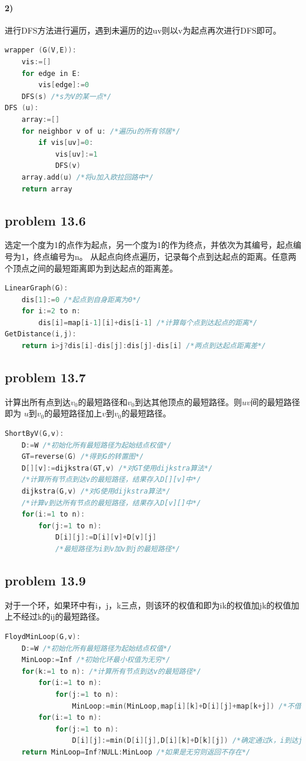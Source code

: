 \documentclass[11pt,a4paper,oneside,oldfontcommands]{ctexart}
\begin{document}
\paragraph*{2)}
进行DFS方法进行遍历，遇到未遍历的边uv则以v为起点再次进行DFS即可。
\begin{lstlisting}[language=C++,title=Euler.func]
wrapper (G(V,E)):
	vis:=[]
	for edge in E:
		vis[edge]:=0
	DFS(s) /*s为V的某一点*/
DFS (u):
	array:=[]
	for neighbor v of u: /*遍历u的所有邻居*/
		if vis[uv]=0:
			vis[uv]:=1
			DFS(v)
	array.add(u) /*将u加入欧拉回路中*/
	return array
\end{lstlisting}
\newpage
{\subsection*{problem 13.6}}
选定一个度为1的点作为起点，另一个度为1的作为终点，并依次为其编号，起点编号为1，终点编号为n。
从起点向终点遍历，记录每个点到达起点的距离。任意两个顶点之间的最短距离即为到达起点的距离差。
\begin{lstlisting}[language=C++,title=LinearGraph.func]
LinearGraph(G):
	dis[1]:=0 /*起点到自身距离为0*/
	for i:=2 to n:
		dis[i]=map[i-1][i]+dis[i-1] /*计算每个点到达起点的距离*/
GetDistance(i,j):
	return i>j?dis[i]-dis[j]:dis[j]-dis[i] /*两点到达起点距离差*/
\end{lstlisting}
{\subsection*{problem 13.7}}
计算出所有点到达$v_0$的最短路径和$v_0$到达其他顶点的最短路径。则$uv$间的最短路径即为
$u$到$v_0$的最短路径加上$v$到$v_0$的最短路径。
\begin{lstlisting}[language=C++,title=ShortByV.func]
ShortByV(G,v):
	D:=W /*初始化所有最短路径为起始结点权值*/
	GT=reverse(G) /*得到G的转置图*/
	D[][v]:=dijkstra(GT,v) /*对GT使用dijkstra算法*/
	/*计算所有节点到达v的最短路径，结果存入D[][v]中*/
	dijkstra(G,v) /*对G使用dijkstra算法*/
	/*计算v到达所有节点的最短路径，结果存入D[v][]中*/
	for(i:=1 to n):
		for(j:=1 to n):
			D[i][j]:=D[i][v]+D[v][j] 
			/*最短路径为i到v加v到j的最短路径*/
\end{lstlisting}
\newpage
{\subsection*{problem 13.9}}
对于一个环，如果环中有i，j，k三点，则该环的权值和即为ik的权值加jk的权值加上不经过k的ij的最短路径。
\begin{lstlisting}[language=C++,title=FloydMinLoop.func]
FloydMinLoop(G,v):
	D:=W /*初始化所有最短路径为起始结点权值*/
	MinLoop:=Inf /*初始化环最小权值为无穷*/
	for(k:=1 to n): /*计算所有节点到达v的最短路径*/
		for(i:=1 to n):
			for(j:=1 to n):
				MinLoop:=min(MinLoop,map[i][k]+D[i][j]+map[k+j]) /*不借助k，i到达j的最短路径*/
		for(i:=1 to n):
			for(j:=1 to n):
				D[i][j]:=min(D[i][j],D[i][k]+D[k][j]) /*确定通过k，i到达j的最短路径*/
	return MinLoop=Inf?NULL:MinLoop /*如果是无穷则返回不存在*/
\end{lstlisting}
\end{document}
